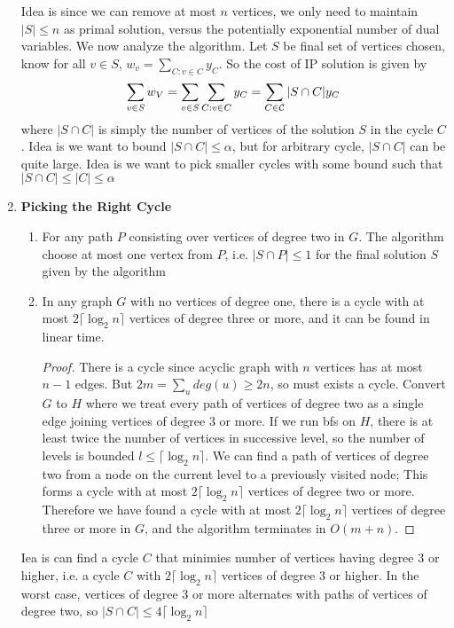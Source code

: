 \documentclass[11pt]{article}
\begin{document}
\begin{enumerate}
\begin{algorithm}[H]
    \end{algorithm}
    Idea is since we can remove at most $n$ vertices, we only need to maintain $|S| \leq n$ as primal solution, versus the potentially exponential number of dual variables. We now analyze the algorithm. Let $S$ be final set of vertices chosen, know for all $v\in S$, $w_v = \textstyle\sum_{C:v\in C} y_C$. So the cost of IP solution is given by 
    \[
        \sum_{v\in S} w_V = \sum_{v\in S}\sum_{C:v\in C} y_C 
        = \sum_{C\in\mathcal{C}} |S\cap C| y_C    
    \]
    where $|S\cap C|$ is simply the number of vertices of the solution $S$ in the cycle $C$. Idea is we want to bound $|S\cap C| \leq \alpha$, but for arbitrary cycle, $|S\cap C|$ can be quite large. Idea is we want to pick smaller cycles with some bound such that $|S\cap C| \leq |C| \leq \alpha$
    \item \textbf{Picking the Right Cycle}
    \begin{enumerate}
        \item For any path $P$ consisting over vertices of degree two in $G$. The algorithm choose at most one vertex from $P$, i.e. $|S \cap P| \leq 1$ for the final solution $S$ given by the algorithm 
        \item In any graph $G$ with no vertices of degree one, there is a cycle with at most $2\lceil \log_2 n \rceil$ vertices of degree three or more, and it can be found in linear time. 
        \begin{proof}
            There is a cycle since acyclic graph with $n$ vertices has at most $n-1$ edges. But $2m = \textstyle \sum_u deg(u) \geq 2n$, so must exists a cycle. Convert $G$ to $H$ where we treat every path of vertices of degree two as a single edge joining vertices of degree 3 or more. If we run bfs on $H$, there is at least twice the number of vertices in successive level, so the number of levels is bounded $l \leq \lceil \log_2 n \rceil$. We can find a path of vertices of degree two from a node on the current level to a previously visited node; This forms a cycle with at most $2\lceil \log_2 n \rceil$ vertices of degree two or more. Therefore we have found a cycle with at most $2\lceil \log_2 n \rceil$ vertices of degree three or more in $G$, and the algorithm terminates in $O(m+n)$.
        \end{proof}
    \end{enumerate}
    Iea is can find a cycle $C$ that minimies number of vertices having degree 3 or higher, i.e. a cycle $C$ with $2\lceil \log_2 n \rceil$ vertices of degree 3 or higher. In the worst case, vertices of degree 3 or more alternates with paths of vertices of degree two, so $|S\cap C| \leq 4\lceil \log_2 n \rceil$

\end{enumerate}
\end{document}
